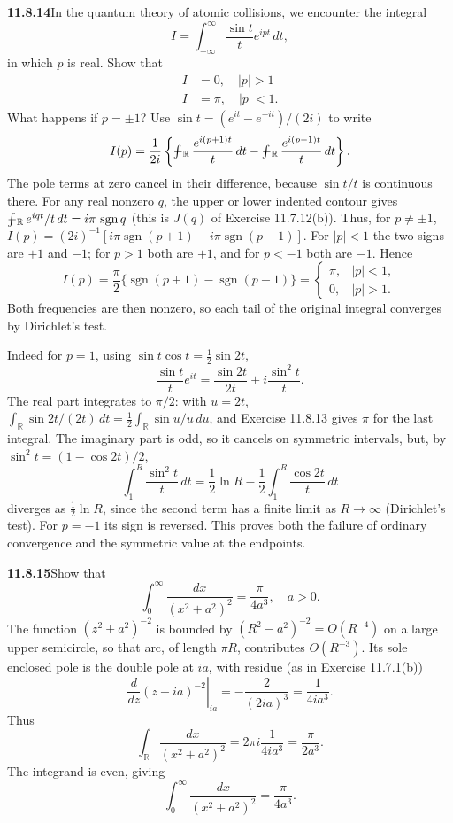\par\bigskip
\noindent\textbf{11.8.14}\quad In the quantum theory of atomic collisions, we
encounter the integral
\[
I=\int_{-\infty}^{\infty}\frac{\sin t}{t}e^{ipt}\,dt,
\]
in which $p$ is real. Show that
\begin{align*}
I&=0,\quad|p|>1\\
I&=\pi,\quad|p| < 1.
\end{align*}
What happens if $p=\pm1$?
\solution
Use $\sin t=(e^{it}-e^{-it})/(2i)$ to write
\[
I(p)=\frac1{2i}\left\{
\PVint_{\mathbb R}\frac{e^{i(p+1)t}}t\,dt
-\PVint_{\mathbb R}\frac{e^{i(p-1)t}}t\,dt\right\}.
\]
The pole terms at zero cancel in their difference, because
$\sin t/t$ is continuous there. For any real nonzero $q$, the
upper or lower indented contour gives
$\PVint_{\mathbb R}e^{iqt}/t\,dt=i\pi\,\operatorname{sgn}q$
(this is $J(q)$ of Exercise 11.7.12(b)).
Thus, for $p\ne\pm1$,
$I(p)=(2i)^{-1}[i\pi\operatorname{sgn}(p+1)-i\pi\operatorname{sgn}(p-1)]$.
For $|p|<1$ the two signs are $+1$ and $-1$; for $p>1$ both are $+1$,
and for $p<-1$ both are $-1$. Hence
\[
\boxed{I(p)=\frac{\pi}{2}
\{\operatorname{sgn}(p+1)-\operatorname{sgn}(p-1)\}
=\begin{cases}\pi,&|p|<1,\\0,&|p|>1.\end{cases}}
\]
Both frequencies are then nonzero, so each tail of the original
integral converges by Dirichlet's test.

Indeed for $p=1$, using $\sin t\cos t=\frac12\sin2t$,
\[
\frac{\sin t}{t}e^{it}
=\frac{\sin2t}{2t}+i\frac{\sin^2t}{t}.
\]
The real part integrates to $\pi/2$: with $u=2t$,
$\int_{\mathbb R}\sin2t/(2t)\,dt=\frac12\int_{\mathbb R}\sin u/u\,du$,
and Exercise 11.8.13 gives $\pi$ for the last integral. The imaginary
part is odd, so it cancels on symmetric intervals, but, by
$\sin^2t=(1-\cos2t)/2$,
\[
\int_1^R\frac{\sin^2t}{t}\,dt
=\frac12\ln R-\frac12\int_1^R\frac{\cos2t}{t}\,dt
\]
diverges as $\frac12\ln R$, since the second term has a finite limit
as $R\to\infty$ (Dirichlet's test).
For $p=-1$ its sign is reversed. This proves both the failure of
ordinary convergence and the symmetric value at the endpoints.

\par\bigskip
\noindent\textbf{11.8.15}\quad Show that
\[
\int_{0}^{\infty}\frac{dx}{(x^{2}+a^{2})^{2}}=\frac{\pi}{4a^{3}},\quad a>0.
\]
\solution
The function $(z^2+a^2)^{-2}$ is bounded by $(R^2-a^2)^{-2}=O(R^{-4})$
on a large upper semicircle, so that arc, of length $\pi R$,
contributes $O(R^{-3})$. Its sole enclosed pole is the double pole at
$ia$, with residue (as in Exercise 11.7.1(b))
\[
\left.\frac{d}{dz}(z+ia)^{-2}\right|_{ia}
=-\frac2{(2ia)^3}=\frac1{4ia^3}.
\]
Thus
\[
\int_{\mathbb R}\frac{dx}{(x^2+a^2)^2}
=2\pi i\frac1{4ia^3}=\frac{\pi}{2a^3}.
\]
The integrand is even, giving
\[
\boxed{\int_0^\infty\frac{dx}{(x^2+a^2)^2}=\frac{\pi}{4a^3}}.
\]


